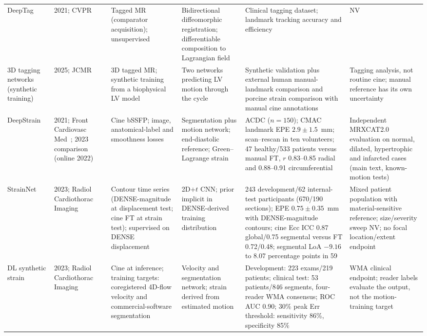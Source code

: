 \documentclass[11pt,a4paper]{article}
\begin{document}
{\begin{longtable}{L{0.11\textwidth}L{0.115\textwidth}L{0.16\textwidth}L{0.185\textwidth}L{0.205\textwidth}L{0.165\textwidth}}
\addlinespace
DeepTag & 2021; CVPR~\cite{ye2021deeptag} & Tagged MR (comparator acquisition); unsupervised & Bidirectional diffeomorphic registration; differentiable composition to Lagrangian field & Clinical tagging dataset; landmark tracking accuracy and efficiency & NV \\
\addlinespace
3D tagging networks (synthetic training) & 2025; JCMR~\cite{buoso2025tagging3d} & 3D tagged MR; synthetic training from a biophysical LV model & Two networks predicting LV motion through the cycle & Synthetic validation plus external human manual-landmark comparison and porcine strain comparison with manual cine annotations & Tagging analysis, not routine cine; manual reference has its own uncertainty \\
\addlinespace
DeepStrain & 2021; Front Cardiovasc Med~\cite{morales2021}; 2023 com\-parison (online 2022)~\cite{morales2022comparison} & Cine bSSFP; image, anatomical-label and smoothness losses & Segmentation plus motion network; end-diastolic reference; Green--Lagrange strain & ACDC (\(n=150\)); CMAC landmark EPE \(2.9\pm1.5\)~mm; scan--rescan in ten volunteers; 47 healthy/533 patients versus manual FT, \(r\) 0.83--0.85 radial and 0.88--0.91 circumferential & Independent MRXCAT2.0 evaluation on normal, dilated, hypertrophic and infarcted cases (main text, known-motion tests) \\
\addlinespace
StrainNet & 2023; Radiol Cardiothorac Imaging~\cite{wang2023strainnet} & Contour time series (DENSE-magnitude at displacement test; cine FT at strain test); supervised on DENSE displacement & 2D\(+t\) CNN; prior implicit in DENSE-derived training distribution & 243 development/62 internal-test participants (670/190 sections); EPE \(0.75\pm0.35\)~mm with DENSE-magnitude contours; cine Ecc ICC 0.87 global/0.75 segmental versus FT 0.72/0.48; segmental LoA \(-9.16\) to 8.07 percentage points in 59 & Mixed patient population with material-sensitive reference; size/severity sweep NV; no focal location/extent endpoint \\
\addlinespace
DL synthetic strain & 2023; Radiol Cardiothorac Imaging~\cite{masutani2023dlss} & Cine at inference; training targets: coregistered 4D-flow velocity and commercial-software segmentation & Velocity and segmentation network; strain derived from estimated motion & Development: 223 exams/219 patients; clinical test: 53 patients/846 segments, four-reader WMA consensus; ROC AUC 0.90; 30\% peak Err threshold: sensitivity 86\%, specificity 85\% & WMA clinical endpoint; reader labels evaluate the output, not the motion-training target \\

\end{longtable}}
\end{document}

